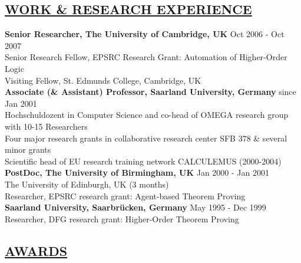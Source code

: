 \documentclass[10pt]{article}
\begin{document}
\vspace*{.5cm}
\subsection*{\underline{WORK \& RESEARCH EXPERIENCE}}

\noindent
\textbf{Senior Researcher, The University of Cambridge, UK}  \hfill Oct 2006 - Oct 2007 \\
Senior Research Fellow, EPSRC Research Grant: Automation of Higher-Order Logic\\
Visiting Fellow, St. Edmunds College, Cambridge, UK\\[-.5em]

\noindent
\textbf{Associate (\& Assistant) Professor, Saarland University, Germany} \hfill since Jan 2001 \\
Hochschuldozent in Computer Science and co-head of OMEGA research group with 10-15 Researchers\\
Four major research grants in collaborative research center SFB 378 \& several minor grants \\
Scientific head of EU research training network CALCULEMUS (2000-2004)\\[-.5em]

\noindent
\textbf{PostDoc, The University of Birmingham, UK}  \hfill Jan 2000 - Jan 2001 \\
The University of Edinburgh, UK \hfill (3 months)\\
Researcher, EPSRC research grant: Agent-based Theorem Proving \\[-.5em]

\noindent
\textbf{Saarland University, Saarbr\"ucken, Germany}  \hfill May 1995 - Dec 1999 \\
Researcher, DFG research grant: Higher-Order Theorem Proving


\subsection*{\underline{AWARDS}}

\end{document}
